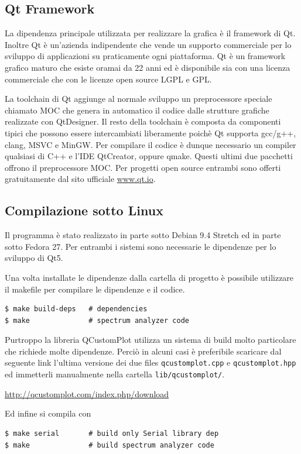 \subsection{Qt Framework}
La dipendenza principale utilizzata per realizzare la grafica \`e il framework
di Qt. Inoltre Qt \`e un'azienda indipendente che vende un supporto
commerciale per lo sviluppo di applicazioni su praticamente ogni piattaforma.
Qt \`e un framework grafico maturo che esiste oramai da 22 anni ed \`e
disponibile sia con una licenza commerciale che con le licenze open source
LGPL e GPL.

La toolchain di Qt aggiunge al normale sviluppo un preprocessore speciale
chiamato MOC che genera in automatico il codice dalle strutture grafiche
realizzate con QtDesigner. Il resto della toolchain \`e composta da componenti
tipici che possono essere intercambiati liberamente poich\`e Qt supporta
gcc/g++, clang, MSVC e MinGW. Per compilare il codice \`e dunque necessario un
compiler qualsiasi di C++ e l'IDE QtCreator, oppure qmake. Questi ultimi due
pacchetti offrono il preprocessore MOC. Per progetti open source entrambi sono
offerti gratuitamente dal sito ufficiale \url{www.qt.io}.

\subsection{Compilazione sotto Linux}
Il programma \`e stato realizzato in parte sotto Debian 9.4 Stretch ed in
parte sotto Fedora 27. Per entrambi i sistemi sono necessarie le dipendenze
per lo sviluppo di Qt5.

\noindent Una volta installate le dipendenze dalla cartella di progetto \`e
possibile utilizzare il makefile per compilare le dipendenze e il codice.
\begin{Verbatim}[frame=single]
$ make build-deps   # dependencies
$ make              # spectrum analyzer code 
\end{Verbatim}
Purtroppo la libreria QCustomPlot utilizza un sistema di build molto
particolare che richiede molte dipendenze. Perci\`o in alcuni casi \`e
preferibile scaricare dal seguente link l'ultima versione dei due files
\texttt{qcustomplot.cpp} e \texttt{qcustomplot.hpp} ed immetterli manualmente
nella cartella \texttt{lib/qcustomplot/}.
\begin{center}
\url{http://qcustomplot.com/index.php/download}
\end{center}
Ed infine si compila con
\begin{Verbatim}[frame=single]
$ make serial       # build only Serial library dep
$ make              # build spectrum analyzer code 
\end{Verbatim}

